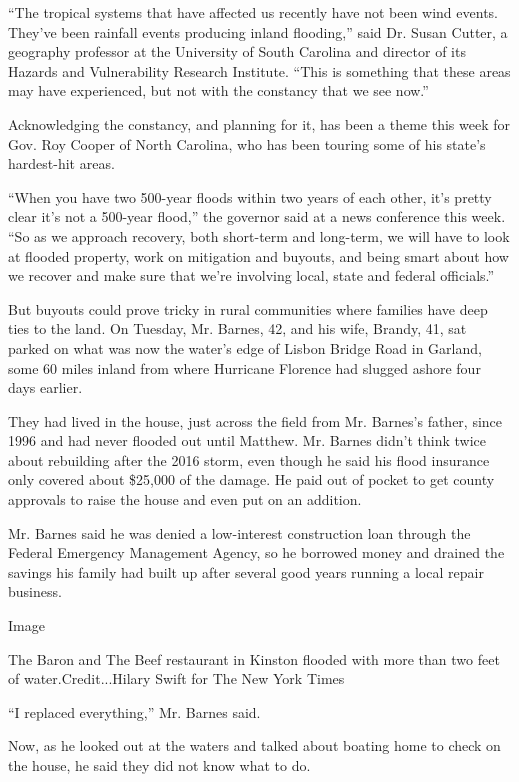 ``The tropical systems that have affected us recently have not been wind
events. They've been rainfall events producing inland flooding,'' said
Dr. Susan Cutter, a geography professor at the University of South
Carolina and director of its Hazards and Vulnerability Research
Institute. ``This is something that these areas may have experienced,
but not with the constancy that we see now.''

Acknowledging the constancy, and planning for it, has been a theme this
week for Gov. Roy Cooper of North Carolina, who has been touring some of
his state's hardest-hit areas.

``When you have two 500-year floods within two years of each other, it's
pretty clear it's not a 500-year flood,'' the governor said at a news
conference this week. ``So as we approach recovery, both short-term and
long-term, we will have to look at flooded property, work on mitigation
and buyouts, and being smart about how we recover and make sure that
we're involving local, state and federal officials.''

But buyouts could prove tricky in rural communities where families have
deep ties to the land. On Tuesday, Mr. Barnes, 42, and his wife, Brandy,
41, sat parked on what was now the water's edge of Lisbon Bridge Road in
Garland, some 60 miles inland from where Hurricane Florence had slugged
ashore four days earlier.

They had lived in the house, just across the field from Mr. Barnes's
father, since 1996 and had never flooded out until Matthew. Mr. Barnes
didn't think twice about rebuilding after the 2016 storm, even though he
said his flood insurance only covered about \$25,000 of the damage. He
paid out of pocket to get county approvals to raise the house and even
put on an addition.

Mr. Barnes said he was denied a low-interest construction loan through
the Federal Emergency Management Agency, so he borrowed money and
drained the savings his family had built up after several good years
running a local repair business.

Image

The Baron and The Beef restaurant in Kinston flooded with more than two
feet of water.Credit...Hilary Swift for The New York Times

``I replaced everything,'' Mr. Barnes said.

Now, as he looked out at the waters and talked about boating home to
check on the house, he said they did not know what to do.

